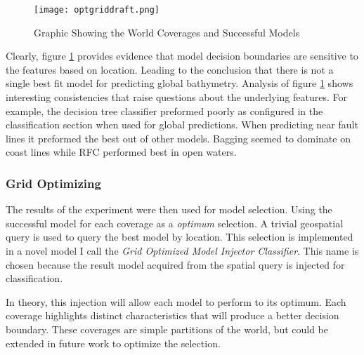 \begin{figure}[h]
    \centering
    \texttt{[image: optgriddraft.png]}
    \caption{Graphic Showing the World Coverages and Successful Models}
    \label{fig:coveragegrid}
\end{figure}

\par
Clearly, figure \ref{fig:coveragegrid} provides evidence that model decision boundaries are sensitive to the features based on location.
Leading to the conclusion that there is not a single best fit model for predicting global bathymetry.
Analysis of figure \ref{fig:coveragegrid} shows interesting consistencies that raise questions about the underlying features.
For example, the decision tree classifier preformed poorly as configured in the classification section when used for global predictions.
When predicting near fault lines it preformed the best out of other models.
Bagging seemed to dominate on coast lines while \ac{RFC} performed best in open waters.

\subsubsection{Grid Optimizing}
The results of the experiment were then used for model selection.
Using the successful model for each coverage as a \textit{optimum} selection.
A trivial geospatial query is used to query the best model by location.
This selection is implemented in a novel model I call the \textit{Grid Optimized Model Injector Classifier}.
This name is chosen because the result model acquired from the spatial query is injected for classification.

\par
In theory, this injection will allow each model to perform to its optimum.
Each coverage highlights distinct characteristics that will produce a better decision boundary.
These coverages are simple partitions of the world, but could be extended in future work to optimize the selection.


